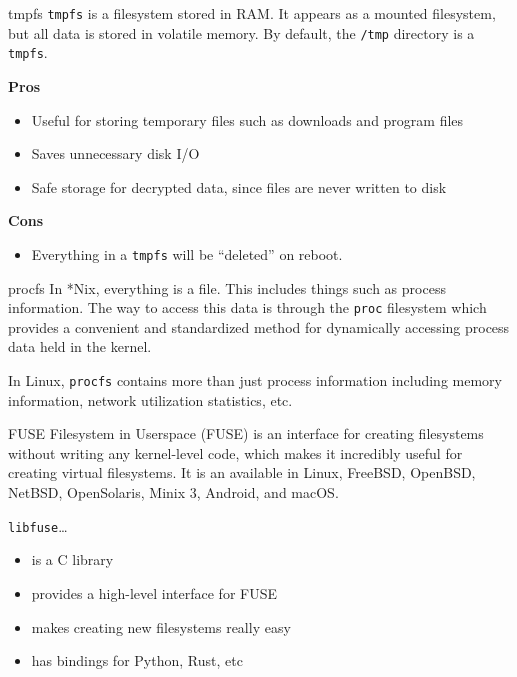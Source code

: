 \documentclass{lug}
\begin{document}
\begin{frame}{tmpfs}
    \texttt{tmpfs} is a filesystem stored in RAM. It appears as a mounted
    filesystem, but all data is stored in volatile memory. By default, the
    \texttt{/tmp} directory is a \texttt{tmpfs}.

    \textbf{Pros}
    \begin{itemize}
        \item Useful for storing temporary files such as downloads and program
            files
        \item Saves unnecessary disk I/O
        \item Safe storage for decrypted data, since files are never written to
            disk
    \end{itemize}

    \textbf{Cons}
    \begin{itemize}
        \item Everything in a \texttt{tmpfs} will be ``deleted'' on reboot.
    \end{itemize}
\end{frame}

\begin{frame}{procfs}
    In *Nix, everything is a file. This includes things such as process
    information. The way to access this data is through the \texttt{proc}
    filesystem which provides a convenient and standardized method for
    dynamically accessing process data held in the kernel.

    In Linux, \texttt{procfs} contains more than just process information
    including memory information, network utilization statistics, etc.
\end{frame}

\begin{frame}{FUSE}
Filesystem in Userspace (FUSE) is an interface for creating filesystems
without writing any kernel-level code, which makes it incredibly useful for
creating virtual filesystems. It is an available in Linux, FreeBSD, OpenBSD,
NetBSD, OpenSolaris, Minix 3, Android, and macOS.

\texttt{libfuse}\ldots \begin{itemize}
    \item is a C library
    \item provides a high-level interface for FUSE
    \item makes creating new filesystems really easy
    \item has bindings for Python, Rust, etc
\end{itemize}
\end{frame}
\end{document}
